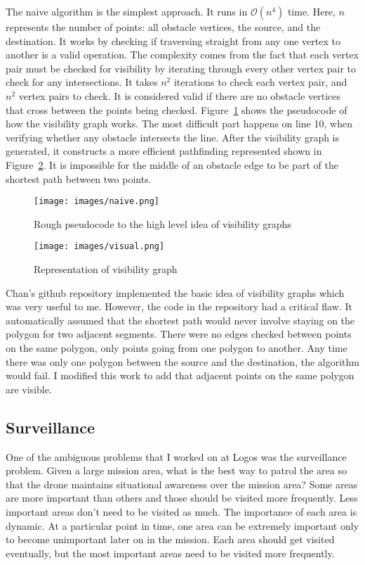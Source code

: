 \documentclass[12pt]{article}
\begin{document}
The naive algorithm is the simplest approach. It runs in $\mathcal{O}(n^4)$ time. Here, $n$ represents the number of points: all obstacle vertices, the source, and the destination. It works by checking if traversing straight from any one vertex to another is a valid operation. The complexity comes from the fact that each vertex pair must be checked for visibility by iterating through every other vertex pair to check for any intersections. It takes $n^2$ iterations to check each vertex pair, and $n^2$ vertex pairs to check. It is considered valid if there are no obstacle vertices that cross between the points being checked. Figure~\ref{fig:code} shows the pseudocode of how the visibility graph works. The most difficult part happens on line 10, when verifying whether any obstacle intersects the line. After the visibility graph is generated, it constructs a more efficient pathfinding represented shown in Figure~\ref{fig:visual}. It is impossible for the middle of an obstacle edge to be part of the shortest path between two points.

\begin{figure}[h]
    \centering
    \texttt{[image: images/naive.png]}
    \caption{Rough pseudocode to the high level idea of visibility graphs}
    \label{fig:code}
\end{figure}



\begin{figure}[h]
    \centering
    \texttt{[image: images/visual.png]}
    \caption{Representation of visibility graph}
    \label{fig:visual}
\end{figure}

Chan's github repository implemented the basic idea of visibility graphs which was very useful to me. \cite{chanMatthewachanVgraph2022} However, the code in the repository had a critical flaw. It automatically assumed that the shortest path would never involve staying on the polygon for two adjacent segments. There were no edges checked between points on the same polygon, only points going from one polygon to another. Any time there was only one polygon between the source and the destination, the algorithm would fail. I modified this work to add that adjacent points on the same polygon are visible.

\subsection{Surveillance}
One of the ambiguous problems that I worked on at Logos was the surveillance problem. Given a large mission area, what is the best way to patrol the area so that the drone maintains situational awareness over the mission area? Some areas are more important than others and those should be visited more frequently. Less important areas don't need to be visited as much. The importance of each area is dynamic. At a particular point in time, one area can be extremely important only to become unimportant later on in the mission. Each area should get visited eventually, but the most important areas need to be visited more frequently.
\end{document}
